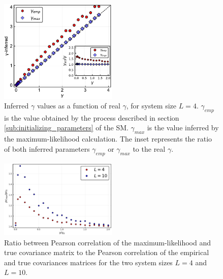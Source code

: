 \documentclass[preprint,amsmath,amssymb,superscriptaddress,showpacs,pre]{revtex4-1}
\begin{document}
\begin{figure}[!htb]
	\centering
	\includegraphics[keepaspectratio=true,width=0.5\textwidth]{Figures/scatter_gamma_L4_100.pdf}
	\caption{Inferred $\gamma$ values as a function of real $\gamma$, for system size $L=4$. $\gamma_{emp}$ is the value obtained by the process described in section \ref{sub:initializing_parameters} of the SM. $\gamma_{max}$ is the value inferred by the maximum-likelihood calculation. 
	The inset represents the ratio of both inferred parameters $\gamma_{emp}$ or $\gamma_{max}$ to the real $\gamma$.}
	\label{fig:scatter_gamma_L4}
\end{figure}


\begin{figure}[!htb]
	\centering
	\includegraphics[keepaspectratio=true,width=0.5\textwidth]{Figures/Pearson_correlation_rate_full_range.pdf}
	\caption{  Ratio between Pearson correlation of the  maximum-likelihood  and true covariance  matrix to the Pearson correlation of the  empirical and true covariances matrices for the two system sizes $L=4$ and $L=10$.}
	\label{fig:pearson_corr_comp_L4}
\end{figure}
\end{document}
